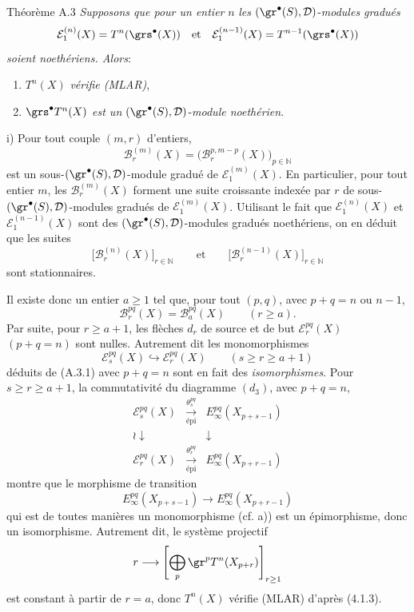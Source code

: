 \begin{statement}{Théorème A.3}
\emph{Supposons que pour un entier} \(n\) \emph{les} \((\gr^\bullet(S),\mathcal{D})\)-\emph{modules gradués}
\[
\mathcal{E}_1^{(n)}(X)=T^n(\grs^\bullet(X))
\quad\text{et}\quad
\mathcal{E}_1^{(n-1)}(X)=T^{n-1}(\grs^\bullet(X))
\]
\emph{soient noethériens. Alors}:
\begin{enumerate}[label=\textup{(\roman*)}]
\item \(T^n(X)\) \emph{vérifie (MLAR)},
\item \(\grs^\bullet T^n(X)\) \emph{est un} \((\gr^\bullet(S),\mathcal{D})\)-\emph{module noethérien}.
\end{enumerate}
\end{statement}

\begin{prooftext}

i) Pour tout couple \((m,r)\) d'entiers,
\[
\mathcal{B}_r^{(m)}(X)=\bigl(\mathcal{B}_r^{p,m-p}(X)\bigr)_{p\in\mathbb{N}}
\]
est un sous-\((\gr^\bullet(S),\mathcal{D})\)-module gradué de \(\mathcal{E}_1^{(m)}(X)\). En particulier, pour tout entier \(m\), les \(\mathcal{B}_r^{(m)}(X)\) forment une suite croissante indexée par \(r\) de sous-\((\gr^\bullet(S),\mathcal{D})\)-modules gradués de \(\mathcal{E}_1^{(m)}(X)\). Utilisant le fait que \(\mathcal{E}_1^{(n)}(X)\) et \(\mathcal{E}_1^{(n-1)}(X)\) sont des \((\gr^\bullet(S),\mathcal{D})\)-modules gradués noethériens, on en déduit que les suites
\[
\bigl[\mathcal{B}_r^{(n)}(X)\bigr]_{r\in\mathbb{N}}
\qquad\text{et}\qquad
\bigl[\mathcal{B}_r^{(n-1)}(X)\bigr]_{r\in\mathbb{N}}
\]
sont stationnaires.

Il
existe donc un entier \(a\ge1\) tel que, pour tout \((p,q)\), avec \(p+q=n\) ou \(n-1\),
\begin{equation}
\mathcal{B}_r^{pq}(X)=\mathcal{B}_a^{pq}(X)\qquad(r\ge a).
\tag{A.3.1}
\end{equation}
Par suite, pour \(r\ge a+1\), les flèches \(d_r\) de source et de but \(\mathcal{E}_r^{pq}(X)\) \((p+q=n)\) sont nulles. Autrement dit les monomorphismes
\[
\mathcal{E}_s^{pq}(X)\hookrightarrow\mathcal{E}_r^{pq}(X)\qquad(s\ge r\ge a+1)
\]
déduits de (A.3.1) avec \(p+q=n\) sont en fait des \emph{isomorphismes}. Pour \(s\ge r\ge a+1\), la commutativité du diagramme \((d_3)\), avec \(p+q=n\),
\[
\begin{array}{ccc}
\mathcal{E}_s^{pq}(X)&\xrightarrow[\text{épi}]{\theta_s^{pq}}&E_\infty^{pq}(X_{p+s-1})\\
\wr\downarrow&&\downarrow\\
\mathcal{E}_r^{pq}(X)&\xrightarrow[\text{épi}]{\theta_r^{pq}}&E_\infty^{pq}(X_{p+r-1})
\end{array}
\]
montre que le morphisme de transition
\[
E_\infty^{pq}(X_{p+s-1})\longrightarrow E_\infty^{pq}(X_{p+r-1})
\]
qui est de toutes manières un monomorphisme (cf. a)) est un épimorphisme, donc un isomorphisme. Autrement dit, le système projectif
\[
r\longrightarrow\left[\bigoplus_p\gr^p T^n(X_{p+r})\right]_{r\ge1}
\]
est constant à partir de \(r=a\), donc \(T^n(X)\) vérifie (MLAR) d'après (4.1.3).


\end{prooftext}
